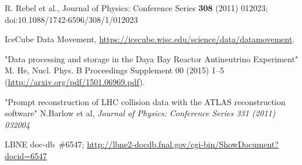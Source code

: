 \begin{thebibliography}{99}
 R. Rebel et al., Journal of Physics: Conference Series {\bf 308} (2011) 012023; doi:10.1088/1742-6596/308/1/012023

%
%

%
%

%
%

 IceCube Data Movement, \url{https://icecube.wisc.edu/science/data/datamovement}.

"Data processing and storage in the Daya Bay Reactor Antineutrino Experiment" M. He, Nucl. Phys. B Proceedings Supplement 00 (2015) 1–5 (\url{http://arxiv.org/pdf/1501.06969.pdf}).

 "Prompt reconstruction of LHC collision data with the ATLAS reconstruction software" N.Barlow et al, \textit{Journal of Physics: Conference Series 331 (2011) 032004}

%
%
 
%
%
 LBNE doc-db~\#6547; \url{http://lbne2-docdb.fnal.gov/cgi-bin/ShowDocument?docid=6547}

%
%


\end{thebibliography}

